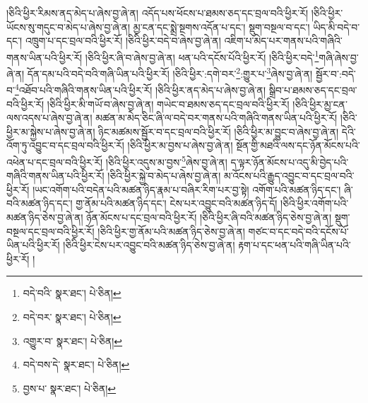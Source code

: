 །ཅིའི་ཕྱིར་རིམས་ནད་མེད་པ་ཞེས་བྱ་ཞེ་ན། འདོད་པས་ཕོངས་པ་ཐམས་ཅད་དང་བྲལ་བའི་ཕྱིར་རོ། །ཅིའི་ཕྱིར་ཡོངས་སུ་གདུང་བ་མེད་པ་ཞེས་བྱ་ཞེ་ན། མྱ་ངན་དང་སྨྲེ་སྔགས་འདོན་པ་དང་། སྡུག་བསྔལ་བ་དང་། ཡིད་མི་བདེ་བ་དང་། འཁྲུག་པ་དང་བྲལ་བའི་ཕྱིར་རོ། །ཅིའི་ཕྱིར་བདེ་བ་ཞེས་བྱ་ཞེ་ན། འཇིག་པ་མེད་པར་གནས་པའི་གཞིའི་གནས་ཡིན་པའི་ཕྱིར་རོ། །ཅིའི་ཕྱིར་ཞི་བ་ཞེས་བྱ་ཞེ་ན། ཕན་པའི་དངོས་པོའི་ཕྱིར་རོ། །ཅིའི་ཕྱིར་བདེ་\footnote{བདེ་བའི་  སྣར་ཐང་།  པེ་ཅིན། }གཞི་ཞེས་བྱ་ཞེ་ན། དོན་དམ་པའི་བདེ་བའི་གཞི་ཡིན་པའི་ཕྱིར་རོ། །ཅིའི་ཕྱིར་:དགེ་བར་\footnote{བདེ་བར་  སྣར་ཐང་།  པེ་ཅིན། }:གྱུར་པ་\footnote{འགྱུར་བ་  སྣར་ཐང་།  པེ་ཅིན། }ཞེས་བྱ་ཞེ་ན། སྦྱོར་བ་:བདེ་བ་\footnote{བདེ་བས་དེ་  སྣར་ཐང་།  པེ་ཅིན། }འཐོབ་པའི་གཞིའི་གནས་ཡིན་པའི་ཕྱིར་རོ། །ཅིའི་ཕྱིར་ནད་མེད་པ་ཞེས་བྱ་ཞེ་ན། སྒྲིབ་པ་ཐམས་ཅད་དང་བྲལ་བའི་ཕྱིར་རོ། །ཅིའི་ཕྱིར་མི་གཡོ་བ་ཞེས་བྱ་ཞེ་ན། གཡེང་བ་ཐམས་ཅད་དང་བྲལ་བའི་ཕྱིར་རོ། །ཅིའི་ཕྱིར་མྱ་ངན་ལས་འདས་པ་ཞེས་བྱ་ཞེ་ན། མཚན་མ་མེད་ཅིང་ཞི་ལ་བདེ་བར་གནས་པའི་གཞིའི་གནས་ཡིན་པའི་ཕྱིར་རོ། །ཅིའི་ཕྱིར་མ་སྐྱེས་པ་ཞེས་བྱ་ཞེ་ན། ཉིང་མཚམས་སྦྱོར་བ་དང་བྲལ་བའི་ཕྱིར་རོ། །ཅིའི་ཕྱིར་མ་བྱུང་བ་ཞེས་བྱ་ཞེ་ན། དེའི་འོག་ཏུ་འབྱུང་བ་དང་བྲལ་བའི་ཕྱིར་རོ། །ཅིའི་ཕྱིར་མ་བྱས་པ་ཞེས་བྱ་ཞེ་ན། སྔོན་གྱི་མཐའི་ལས་དང་ཉོན་མོངས་པའི་འཕེན་པ་དང་བྲལ་བའི་ཕྱིར་རོ། །ཅིའི་ཕྱིར་འདུས་མ་བྱས་\footnote{བྱས་པ་  སྣར་ཐང་།  པེ་ཅིན། }ཞེས་བྱ་ཞེ་ན། ད་ལྟར་ཉོན་མོངས་པ་འདུ་མི་བྱེད་པའི་གཞིའི་གནས་ཡིན་པའི་ཕྱིར་རོ། །ཅིའི་ཕྱིར་སྐྱེ་བ་མེད་པ་ཞེས་བྱ་ཞེ་ན། མ་འོངས་པའི་རྒྱུད་འབྱུང་བ་དང་བྲལ་བའི་ཕྱིར་རོ། །ཡང་འགོག་པའི་བདེན་པའི་མཚན་ཉིད་རྣམ་པ་བཞིར་རིག་པར་བྱ་སྟེ། འགོག་པའི་མཚན་ཉིད་དང་། ཞི་བའི་མཚན་ཉིད་དང་། གྱ་ནོམ་པའི་མཚན་ཉིད་དང་། ངེས་པར་འབྱུང་བའི་མཚན་ཉིད་དོ། །ཅིའི་ཕྱིར་འགོག་པའི་མཚན་ཉིད་ཅེས་བྱ་ཞེ་ན། ཉོན་མོངས་པ་དང་བྲལ་བའི་ཕྱིར་རོ། །ཅིའི་ཕྱིར་ཞི་བའི་མཚན་ཉིད་ཅེས་བྱ་ཞེ་ན། སྡུག་བསྔལ་དང་བྲལ་བའི་ཕྱིར་རོ། །ཅིའི་ཕྱིར་གྱ་ནོམ་པའི་མཚན་ཉིད་ཅེས་བྱ་ཞེ་ན། གཙང་བ་དང་བདེ་བའི་དངོས་པོ་ཡིན་པའི་ཕྱིར་རོ། །ཅིའི་ཕྱིར་ངེས་པར་འབྱུང་བའི་མཚན་ཉིད་ཅེས་བྱ་ཞེ་ན། རྟག་པ་དང་ཕན་པའི་གཞི་ཡིན་པའི་ཕྱིར་རོ། །
